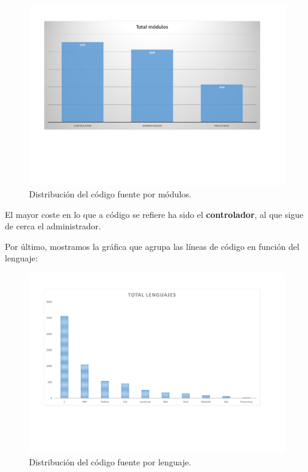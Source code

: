 \begin{figure}[H]
	\noindent \begin{centering}
		\includegraphics[clip=true,trim=50 180 50 50,width=\linewidth]{capitulo5/lineas_modulos}
		\par\end{centering}
	\smallskip
	\caption{\label{fig:lineas_modulos} Distribución del código fuente por módulos.}
\end{figure} 

\smallskip

El mayor coste en lo que a código se refiere ha sido el \textbf{controlador}, al que sigue de cerca el administrador.

Por último, mostramos la gráfica que agrupa las líneas de código en función del lenguaje:

\smallskip

\begin{figure}[H]
	\noindent \begin{centering}
		\includegraphics[clip=true,trim=50 150 50 50,width=\linewidth]{capitulo5/lineas_lenguajes}
		\par\end{centering}
	\smallskip
	\caption{\label{fig:lineas_lenguajes} Distribución del código fuente por lenguaje.}
\end{figure} 

